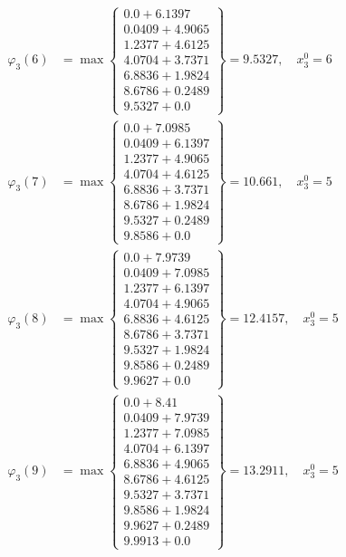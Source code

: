 \documentclass{article}
\begin{document}
\begin{align*}
\varphi_{3}(6) &= \max \left\{ \begin{array}{c}
0.0 + 6.1397 \\
 0.0409 + 4.9065 \\
 1.2377 + 4.6125 \\
 4.0704 + 3.7371 \\
 6.8836 + 1.9824 \\
 8.6786 + 0.2489 \\
 9.5327 + 0.0
\end{array} \right\}=9.5327, \quad x_{3}^0=6\\
  
\varphi_{3}(7) &= \max \left\{ \begin{array}{c}
0.0 + 7.0985 \\
 0.0409 + 6.1397 \\
 1.2377 + 4.9065 \\
 4.0704 + 4.6125 \\
 6.8836 + 3.7371 \\
 8.6786 + 1.9824 \\
 9.5327 + 0.2489 \\
 9.8586 + 0.0
\end{array} \right\}=10.661, \quad x_{3}^0=5\\
  
\varphi_{3}(8) &= \max \left\{ \begin{array}{c}
0.0 + 7.9739 \\
 0.0409 + 7.0985 \\
 1.2377 + 6.1397 \\
 4.0704 + 4.9065 \\
 6.8836 + 4.6125 \\
 8.6786 + 3.7371 \\
 9.5327 + 1.9824 \\
 9.8586 + 0.2489 \\
 9.9627 + 0.0
\end{array} \right\}=12.4157, \quad x_{3}^0=5\\
  
\varphi_{3}(9) &= \max \left\{ \begin{array}{c}
0.0 + 8.41 \\
 0.0409 + 7.9739 \\
 1.2377 + 7.0985 \\
 4.0704 + 6.1397 \\
 6.8836 + 4.9065 \\
 8.6786 + 4.6125 \\
 9.5327 + 3.7371 \\
 9.8586 + 1.9824 \\
 9.9627 + 0.2489 \\
 9.9913 + 0.0
\end{array} \right\}=13.2911, \quad x_{3}^0=5\\
  

\end{align*}
\end{document}
